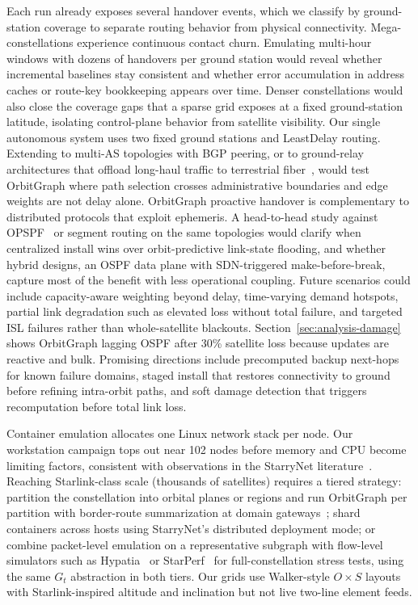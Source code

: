 Each run already exposes several handover events, which we classify by
ground-station coverage to separate routing behavior from physical connectivity.
Mega-constellations experience continuous contact churn. Emulating multi-hour
windows with dozens of handovers per ground station would reveal whether
incremental baselines stay consistent and whether error accumulation in address
caches or route-key bookkeeping appears over time. Denser constellations would
also close the coverage gaps that a sparse grid exposes at a fixed ground-station
latitude, isolating control-plane behavior from satellite visibility.
Our single autonomous system uses two fixed ground stations and LeastDelay
routing. Extending to multi-AS topologies with BGP peering, or to ground-relay
architectures that offload long-haul traffic to terrestrial
fiber~\cite{handley:ground-relays:2019}, would test OrbitGraph where path
selection crosses administrative boundaries and edge weights are not delay alone.
OrbitGraph proactive handover is complementary to distributed protocols that
exploit ephemeris. A head-to-head study against OPSPF~\cite{pam:opspf:2019} or
segment routing on the same topologies would clarify when centralized install
wins over orbit-predictive link-state flooding, and whether hybrid designs, an
OSPF data plane with SDN-triggered make-before-break, capture most of the
benefit with less operational coupling.
Future scenarios could include capacity-aware weighting beyond delay,
time-varying demand hotspots, partial link degradation such as elevated loss
without total failure, and targeted ISL failures rather than whole-satellite
blackouts.
Section~\ref{sec:analysis-damage} shows OrbitGraph lagging OSPF after
30\% satellite loss because updates are reactive and bulk. Promising directions
include precomputed backup next-hops for known failure domains, staged install
that restores connectivity to ground before refining intra-orbit paths, and soft
damage detection that triggers recomputation before total link loss.

Container emulation allocates one Linux network stack per node. Our workstation
campaign tops out near 102 nodes before memory and CPU become limiting factors,
consistent with observations in the StarryNet literature~\cite{lai2023starrynet}.
Reaching Starlink-class scale (thousands of satellites) requires a tiered
strategy: partition the constellation into orbital planes or regions and run
OrbitGraph per partition with border-route summarization at domain
gateways~\cite{gregory:satellite-routing:2022}; shard containers across hosts
using StarryNet's distributed deployment mode; or combine packet-level emulation
on a representative subgraph with flow-level simulators such as
Hypatia~\cite{kassing2020exploring} or StarPerf~\cite{lai2020starperf} for
full-constellation stress tests, using the same $G_t$ abstraction in both tiers.
Our grids use Walker-style $O{\times}S$ layouts with Starlink-inspired altitude
and inclination but not live two-line element feeds.

